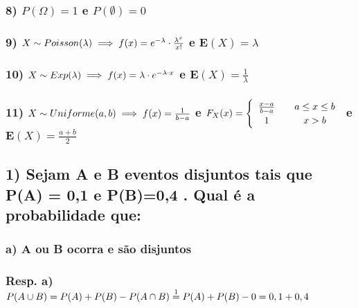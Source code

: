 \documentclass[portuguese]{article}
\begin{document}
\subsubsection*{8) $P(\Omega)=1$ e $P(\emptyset)=0$}


\subsubsection*{9) $X\sim Poisson(\lambda)\protect\implies f(x)=e^{-\lambda}\cdot\frac{\lambda^{x}}{x!}$
e $\mathbf{E}(X)=\lambda$}


\subsubsection*{10) $X\sim Exp(\lambda)\protect\implies f(x)=\lambda\cdot e^{-\lambda\cdot x}$
e $\mathbf{E}(X)=\frac{1}{\lambda}$}


\subsubsection*{11) $X\sim Uniforme(a,b)\protect\implies f(x)=\frac{1}{b-a}$ e $F_{X}(x)=\protect\begin{cases}
\protect\begin{array}{c}
\frac{x-a}{b-a}\protect\\
1
\protect\end{array} & \protect\begin{array}{c}
a\leq x\leq b\protect\\
x>b
\protect\end{array}\protect\end{cases}$ e $\mathbf{E}(X)=\frac{a+b}{2}$}

\textcompwordmark{}


\subsection*{\textmd{1) Sejam A e B eventos disjuntos tais que P(A) = 0,1 e P(B)=0,4
. Qual é a probabilidade que:}}


\subsubsection*{\textmd{a) A ou B ocorra e são disjuntos}}


\subsubsection*{\textmd{Resp. a) $P(A\cup B)\protect\overset{}{=}P(A)+P(B)-P(A\cap B)\protect\overset{1}{=}P(A)+P(B)-0=0,1+0,4$}}
\end{document}
